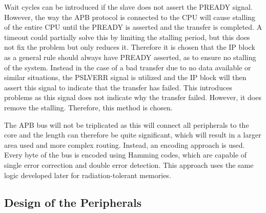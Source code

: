 Wait cycles can be introduced if the slave does not assert the PREADY signal. However, the way the APB protocol is connected to the CPU will cause stalling of the entire CPU until the PREADY is asserted and the transfer is completed. A timeout could partially solve this by limiting the stalling period, but this does not fix the problem but only reduces it. Therefore it is chosen that the IP block as a general rule should always have PREADY asserted, as to ensure no stalling of the system. Instead in the case of a bad transfer due to no data available or similar situations, the PSLVERR signal is utilized and the IP block will then assert this signal to indicate that the transfer has failed. This introduces problems as this signal does not indicate why the transfer failed. However, it does remove the stalling. Therefore, this method is chosen. 

The APB bus will not be triplicated as this will connect all peripherals to the core and the length can therefore be quite significant, which will result in a larger area used and more complex routing. Instead, an encoding approach is used. Every byte of the bus is encoded using Hamming codes, which are capable of single error correction and double error detection. This approach uses the same logic developed later for radiation-tolerant memories. 

\subsection{Design of the Peripherals}



